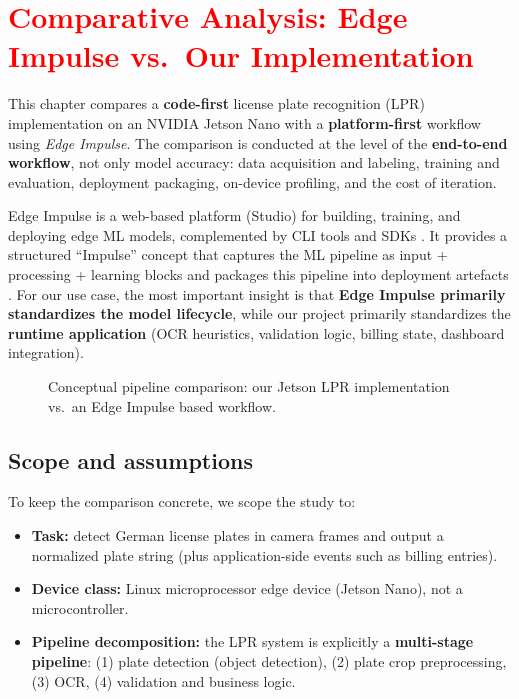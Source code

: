 \chapter{\textcolor{red}{Comparative Analysis: Edge Impulse vs.\ Our Implementation}}
\label{sec:edge_impulse_compare}

\noindent
This chapter compares a \textbf{code-first} license plate recognition (LPR) implementation on an NVIDIA Jetson Nano with a \textbf{platform-first} workflow using \textit{Edge Impulse}.
The comparison is conducted at the level of the \textbf{end-to-end workflow}, not only model accuracy:
data acquisition and labeling, training and evaluation, deployment packaging, on-device profiling, and the cost of iteration.

\noindent
Edge Impulse is a web-based platform (Studio) for building, training, and deploying edge ML models, complemented by CLI tools and SDKs \cite{EdgeImpulseStudioOverview}.
It provides a structured ``Impulse'' concept that captures the ML pipeline as input + processing + learning blocks and packages this pipeline into deployment artefacts \cite{EdgeImpulseImpulseDesign}.
For our use case, the most important insight is that \textbf{Edge Impulse primarily standardizes the model lifecycle}, while our project primarily standardizes the \textbf{runtime application} (OCR heuristics, validation logic, billing state, dashboard integration).

\begin{figure}[htbp]
	\centering
	
	\caption{Conceptual pipeline comparison: our Jetson LPR implementation vs.\ an Edge Impulse based workflow.}
	\label{fig:edge_impulse_pipeline_compare}
\end{figure}

\section{Scope and assumptions}
\label{sec:edge_impulse_scope}

\noindent
To keep the comparison concrete, we scope the study to:
\begin{itemize}
	\item \textbf{Task:} detect German license plates in camera frames and output a normalized plate string (plus application-side events such as billing entries).
	\item \textbf{Device class:} Linux microprocessor edge device (Jetson Nano), not a microcontroller.
	\item \textbf{Pipeline decomposition:} the LPR system is explicitly a \textbf{multi-stage pipeline}:
	(1) plate detection (object detection), (2) plate crop preprocessing, (3) OCR, (4) validation and business logic.
\end{itemize}

